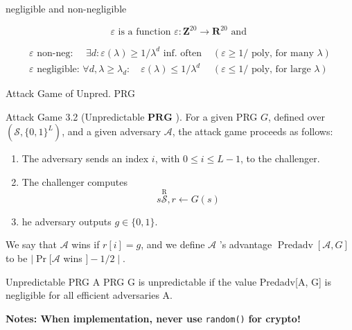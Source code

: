 \begin{definition}  negligible and non-negligible

    $$
    \varepsilon \text { is a function } \varepsilon: \mathbf{Z}^{20} \rightarrow \mathbf{R}^{20} \text { and }
    $$

    $$
    \begin{array}{ll}
    \varepsilon \text { non-neg: } \quad \exists d: \varepsilon(\lambda) \geq 1 / \lambda^{d} \text { inf. often } & (\varepsilon \geq 1 / \text { poly, for many } \lambda) \\
    \varepsilon \text { negligible: } \forall d, \lambda \geq \lambda_{d}: \quad \varepsilon(\lambda) \leq 1 / \lambda^{d} & (\varepsilon \leq 1 / \text { poly, for large } \lambda)
    \end{array}
    $$
        
    
\end{definition}

\begin{method}  Attack Game of Unpred. PRG

    Attack Game 3.2 (Unpredictable $\boldsymbol{P R G}$ ). For a given PRG $G$, defined over $\left(\mathcal{S},\{0,1\}^{L}\right)$, and a given adversary $\mathcal{A}$, the attack game proceeds as follows:
    \begin{enumerate} [itemsep=2pt,topsep=0pt,parsep=0pt]
        \item The adversary sends an index $i$, with $0 \leq i \leq L-1$, to the challenger.
        \item The challenger computes
        $$
        s \stackrel{\mathrm{R}}{\mathcal{S}}, r \leftarrow G(s)
        $$
        \item he adversary outputs $g \in\{0,1\}$.
    \end{enumerate}
    We say that $\mathcal{A}$ wins if $r[i]=g$, and we define $\mathcal{A}$ 's advantage $\operatorname{Predadv}[\mathcal{A}, G]$ to be $\mid \operatorname{Pr}[\mathcal{A}$ wins $]-1 / 2 \mid$.
    
\end{method}

\begin{definition}  Unpredictable PRG
    A PRG G is unpredictable if the value Predadv[A, G] is negligible for all efficient adversaries A.
\end{definition}

\textbf{Notes: When implementation, never use} \verb!random()! \textbf{for crypto!}

